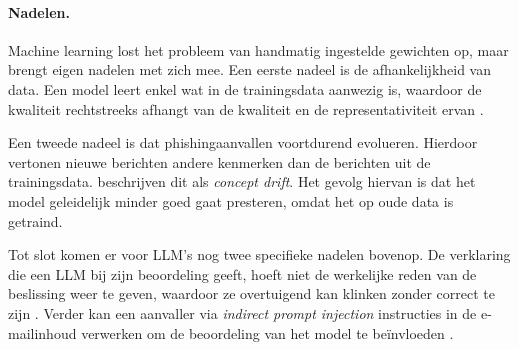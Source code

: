 \paragraph{Nadelen.}
\label{subsubsec:machinelearning-detectie:nadelen}
Machine learning lost het probleem van handmatig ingestelde gewichten op, maar brengt eigen nadelen met zich mee. Een eerste nadeel is de afhankelijkheid van data. Een model leert enkel wat in de trainingsdata aanwezig is, waardoor de kwaliteit rechtstreeks afhangt van de kwaliteit en de representativiteit ervan \autocite{Mendes2025}.

Een tweede nadeel is dat phishingaanvallen voortdurend evolueren. Hierdoor vertonen nieuwe berichten andere kenmerken dan de berichten uit de trainingsdata. \textcite{Fernando2026} beschrijven dit als \emph{concept drift}. Het gevolg hiervan is dat het model geleidelijk minder goed gaat presteren, omdat het op oude data is getraind.

Tot slot komen er voor LLM's nog twee specifieke nadelen bovenop. De verklaring die een LLM bij zijn beoordeling geeft, hoeft niet de werkelijke reden van de beslissing weer te geven, waardoor ze overtuigend kan klinken zonder correct te zijn \autocite{Turpin2023}. Verder kan een aanvaller via \emph{indirect prompt injection} instructies in de e-mailinhoud verwerken om de beoordeling van het model te beïnvloeden \autocite{Greshake2023}.